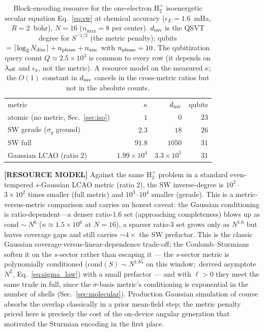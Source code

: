 \documentclass[aps,pra,twocolumn,superscriptaddress,longbibliography]{revtex4-2}
\begin{document}
\begin{table}
\caption{Block-encoding resource for the one-electron $\mathrm{H}_2^+$ isoenergetic secular
equation Eq.~\eqref{eq:sw} at chemical accuracy ($\epsilon_E=1.6$~mHa, $R=2$~bohr),
$N=16$ ($n_{\max}=8$ per center).  $d_{\rm inv}$ is the QSVT degree for $S^{-1/2}$ (the metric
penalty); qubits $=\lceil\log_2 N_{\rm dim}\rceil+n_{\rm phase}+n_{\rm anc}$ with
$n_{\rm phase}=10$.  The qubitization query count $Q\approx2.5\times10^3$ is common to every
row (it depends on $\lambda_{\rm eff}$ and $\epsilon_k$, not the metric).  A resource model on
the measured $\kappa$; the $O(1)$ constant in $d_{\rm inv}$ cancels in the cross-metric ratios
but not in the absolute counts.}
\label{tab:resource}
\begin{ruledtabular}
\begin{tabular}{lrrr}
metric & $\kappa$ & $d_{\rm inv}$ & qubits \\
\colrule
atomic (no metric, Sec.~\ref{sec:iso}) & $1$ & $0$ & $23$\\
SW gerade ($\sigma_g$ ground) & $2.3$ & $18$ & $26$\\
SW full & $91.8$ & $1050$ & $31$\\
Gaussian LCAO (ratio $2$) & $1.99\times10^4$ & $3.3\times10^5$ & $31$\\
\end{tabular}
\end{ruledtabular}
\end{table}

\textbf{[RESOURCE MODEL]} Against the same $\mathrm{H}_2^+$ problem in a standard even-tempered
$s$-Gaussian LCAO metric (ratio $2$), the SW inverse-degree is $10^2$--$3\times10^2$ times
smaller (full metric) and $10^3$--$10^4$ smaller (gerade).  This is a metric-versus-metric
comparison and carries an honest caveat: the Gaussian conditioning is ratio-dependent---a denser
ratio-$1.6$ set (approaching completeness) blows up as $\mathrm{cond}\sim N^{6}$
($\kappa\approx1.5\times10^6$ at $N=16$), a sparser ratio-$3$ set grows only as $N^{1.6}$ but leaves
coverage gaps and still carries ${\sim}4\times$ the SW prefactor.  This is the classic Gaussian
coverage-versus-linear-dependence trade-off; the Coulomb--Sturmians soften it on the
$s$-sector rather than escaping it --- the $s$-sector metric is polynomially conditioned
($\mathrm{cond}(S)\sim N^{1.85}$ on this window;\ derived asymptote $N^2$,
Eq.~\eqref{eq:sigma_law}) with a small prefactor --- and with $\ell>0$ they
meet the same trade in full, since the $\sigma$-basis metric's conditioning is
exponential in the number of shells (Sec.~\ref{sec:molecular}).  Production Gaussian simulation of course absorbs the overlap
classically in a prior mean-field step; the metric penalty priced here is precisely the cost of
the on-device angular generation that motivated the Sturmian encoding in the first place.
\end{document}
